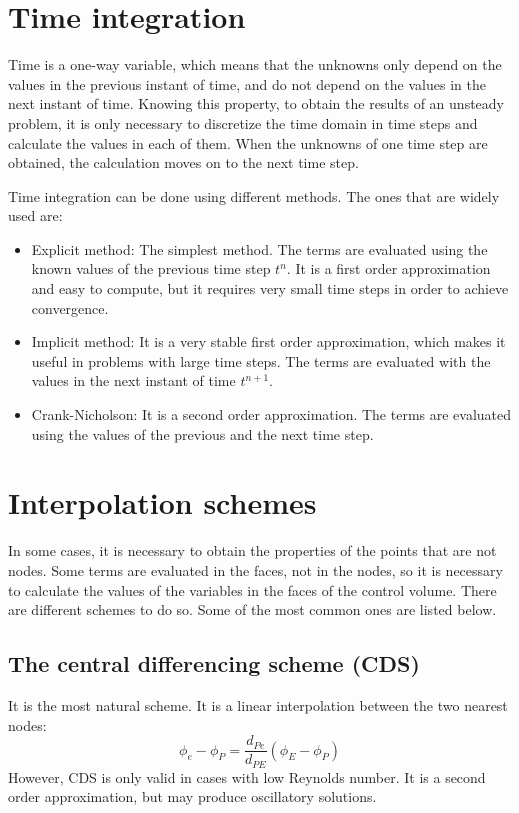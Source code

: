 \section{Time integration}
Time is a one-way variable, which means that the unknowns only depend on the values in the previous instant of time, and do not depend on the values in the next instant of time. Knowing this property, to obtain the results of an unsteady problem, it is only necessary to discretize the time domain in time steps and calculate the values in each of them. When the unknowns of one time step are obtained, the calculation moves on to the next time step.

Time integration can be done using different methods. The ones that are widely used are:
\begin{itemize}
	\item Explicit method: The simplest method. The terms are evaluated using the known values of the previous time step $t^{n}$. It is a first order approximation and easy to compute, but it requires very small time steps in order to achieve convergence.
	\item Implicit method: It is a very stable first order approximation, which makes it useful in problems with large time steps. The terms are evaluated with the values in the next instant of time $t^{n+1}$.
	\item Crank-Nicholson: It is a second order approximation. The terms are evaluated using the values of the previous and the next time step.
\end{itemize}

\section{Interpolation schemes}
In some cases, it is necessary to obtain the properties of the points that are not nodes. Some terms are evaluated in the faces, not in the nodes, so it is necessary to calculate the values of the variables in the faces of the control volume. There are different schemes to do so.  Some of the most common ones are listed below\cite{Patankar1980,Ferziger2002}.

\subsection{The central differencing scheme (CDS)}
It is the most natural scheme. It is a linear interpolation between the two nearest nodes:
\begin{equation}
\phi_{e}-\phi_{P}=\frac{d_{Pe}}{d_{PE}}\left(\phi_{E}-\phi_{P}\right)
\end{equation}
However, CDS is only valid in cases with low Reynolds number. It is a second order approximation, but may produce oscillatory solutions.

